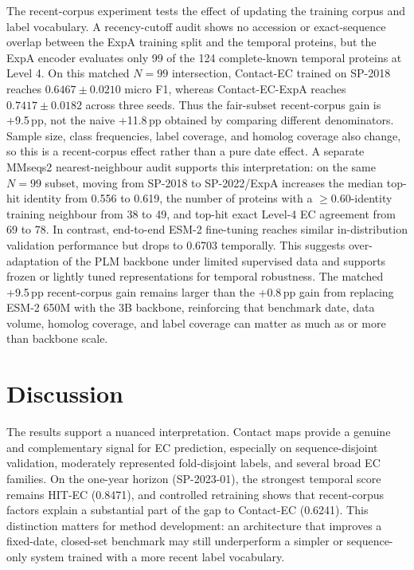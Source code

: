 \documentclass[numbered,contemporary,mediumone]{oup-authoring-template}
\begin{document}
The recent-corpus experiment tests the effect of updating the training corpus and
label vocabulary. A recency-cutoff audit shows no accession or exact-sequence
overlap between the ExpA training split and the temporal proteins, but the ExpA
encoder evaluates only 99 of the 124 complete-known temporal proteins at Level 4.
On this matched $N=99$ intersection, Contact-EC trained on SP-2018 reaches
$0.6467\pm0.0210$ micro F1, whereas Contact-EC-ExpA reaches
$0.7417\pm0.0182$ across three seeds. Thus the fair-subset recent-corpus gain is
+9.5\,pp, not the naive +11.8\,pp obtained by
comparing different denominators. Sample size, class frequencies, label
coverage, and homolog coverage also change, so this is a recent-corpus effect
rather than a pure date effect. A separate MMseqs2 nearest-neighbour audit
supports this interpretation: on the same $N=99$ subset, moving from SP-2018 to
SP-2022/ExpA increases the median top-hit identity from 0.556 to 0.619, the
number of proteins with a $\geq0.60$-identity training neighbour from 38 to 49,
and top-hit exact Level-4 EC agreement from 69 to 78. In contrast,
end-to-end ESM-2 fine-tuning reaches similar in-distribution validation performance
but drops to 0.6703 temporally. This suggests over-adaptation of the PLM backbone
under limited supervised data and supports frozen or lightly tuned representations
for temporal robustness. The matched +9.5\,pp recent-corpus gain remains larger
than the +0.8\,pp gain from replacing ESM-2 650M with the 3B backbone,
reinforcing that benchmark date, data volume, homolog coverage, and label
coverage can matter as much as or more than backbone scale.

\section{Discussion}

The results support a nuanced interpretation. Contact maps provide a genuine
and complementary signal for EC prediction, especially on sequence-disjoint
validation, moderately represented fold-disjoint labels, and several broad EC
families. On the one-year horizon (SP-2023-01), the strongest temporal score
remains HIT-EC (0.8471), and controlled retraining shows that recent-corpus
factors explain a substantial part of the gap to Contact-EC (0.6241). This
distinction matters for method development: an architecture that improves a
fixed-date, closed-set benchmark may still underperform a simpler or sequence-only
system trained with a more recent label vocabulary.
\end{document}
